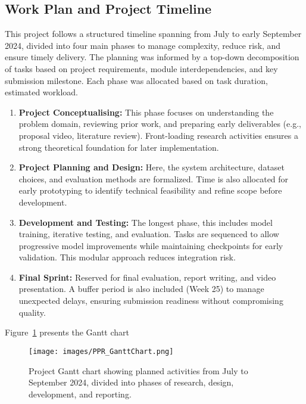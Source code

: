 \documentclass[12pt]{article}
\begin{document}
\subsection{Work Plan and Project Timeline}

This project follows a structured timeline spanning from July to early September 2024, divided into four main phases to manage complexity, reduce risk, and ensure timely delivery. The planning was informed by a top-down decomposition of tasks based on project requirements, module interdependencies, and key submission milestone. Each phase was allocated based on task duration, estimated workload.

\begin{enumerate}
    \item \textbf{Project Conceptualising:} This phase focuses on understanding the problem domain, reviewing prior work, and preparing early deliverables (e.g., proposal video, literature review). Front-loading research activities ensures a strong theoretical foundation for later implementation.

    \item \textbf{Project Planning and Design:} Here, the system architecture, dataset choices, and evaluation methods are formalized. Time is also allocated for early prototyping to identify technical feasibility and refine scope before development.

    \item \textbf{Development and Testing:} The longest phase, this includes model training, iterative testing, and evaluation. Tasks are sequenced to allow progressive model improvements while maintaining checkpoints for early validation. This modular approach reduces integration risk.

    \item \textbf{Final Sprint:} Reserved for final evaluation, report writing, and video presentation. A buffer period is also included (Week 25) to manage unexpected delays, ensuring submission readiness without compromising quality.
\end{enumerate}

Figure~\ref{fig:gantt} presents the Gantt chart

\begin{figure}[H]
    \centering
    \texttt{[image: images/PPR\_GanttChart.png]}
    \caption{Project Gantt chart showing planned activities from July to September 2024, divided into phases of research, design, development, and reporting.}
    \label{fig:gantt}
\end{figure}
\end{document}
